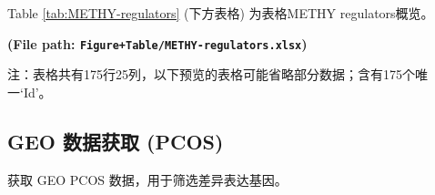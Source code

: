 \documentclass[
]{article}
\begin{document}
Table \ref{tab:METHY-regulators} (下方表格) 为表格METHY regulators概览。

\textbf{(File path: \texttt{Figure+Table/METHY-regulators.xlsx})}

\begin{center}\begin{tcolorbox}[colback=gray!10, colframe=gray!50, width=0.9\linewidth, arc=1mm, boxrule=0.5pt]注：表格共有175行25列，以下预览的表格可能省略部分数据；含有175个唯一`Id'。
\end{tcolorbox}
\end{center}

\begin{center}\vspace{1.5cm}\end{center}

\hypertarget{geo-ux6570ux636eux83b7ux53d6-pcos}{%
\subsection{GEO 数据获取 (PCOS)}\label{geo-ux6570ux636eux83b7ux53d6-pcos}}

获取 GEO PCOS 数据，用于筛选差异表达基因。
\end{document}
